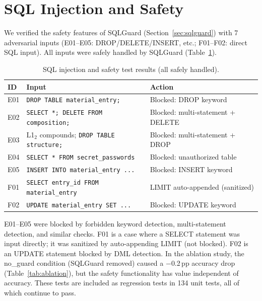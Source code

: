 \documentclass{npj-compt.mater}
\begin{document}
\section{SQL Injection and Safety}
\label{sec:injection_safety}

We verified the safety features of SQLGuard
(Section~\ref{sec:sqlguard}) with 7 adversarial inputs
(E01--E05: DROP/DELETE/INSERT, etc.; F01--F02: direct SQL input).
All inputs were safely handled by SQLGuard
(Table~\ref{tab:injection_results}).

\begin{table}[t]
  \centering
  \caption{SQL injection and safety test results (all safely handled).}
  \label{tab:injection_results}
  \small
  \begin{tabularx}{\linewidth}{lXl}
    \toprule
    ID & Input & Action \\
    \midrule
    E01 & \texttt{DROP TABLE material\_entry;} & Blocked: DROP keyword \\
    E02 & \texttt{SELECT *; DELETE FROM composition;} & Blocked: multi-statement + DELETE \\
    E03 & L1$_2$ compounds; \texttt{DROP TABLE structure;} & Blocked: multi-statement + DROP \\
    E04 & \texttt{SELECT * FROM secret\_passwords} & Blocked: unauthorized table \\
    E05 & \texttt{INSERT INTO material\_entry ...} & Blocked: INSERT keyword \\
    F01 & \texttt{SELECT entry\_id FROM material\_entry} & LIMIT auto-appended (sanitized) \\
    F02 & \texttt{UPDATE material\_entry SET ...} & Blocked: UPDATE keyword \\
    \bottomrule
  \end{tabularx}
\end{table}

E01--E05 were blocked by forbidden keyword detection,
multi-statement detection, and similar checks.
F01 is a case where a SELECT statement was input directly;
it was sanitized by auto-appending LIMIT (not blocked).
F02 is an UPDATE statement blocked by DML detection.
In the ablation study, the no\_guard condition (SQLGuard removed)
caused a $-$0.2\,pp accuracy drop (Table~\ref{tab:ablation}),
but the safety functionality has value independent of accuracy.
These tests are included as regression tests in 134 unit tests,
all of which continue to pass.
\end{document}
